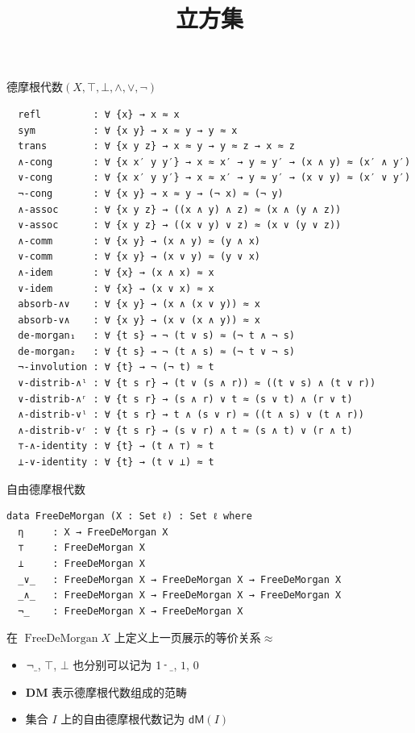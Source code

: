 \documentclass[aspectratio=169,xcolor=dvipsnames]{beamer}
\title{立方集}
\date{}
\newcommand\dM{\mathsf{dM}}
\newcommand\DM{\mathbf{DM}}
\newcommand{\shortminus}{\raisebox{0.3ex}{\scalebox{0.8}[1.0]{-}}}
\newcommand{\mathshortminus}{\mathbin{\text{\normalfont\shortminus}}}
\newcommand{\ul}{{\scalebox{0.4}[1.0]{\_}}}
\DeclareMathOperator\FreeDeMorgan{FreeDeMorgan}
\begin{document}
\begin{frame}
    \titlepage
\end{frame}

\begin{frame}{德摩根代数$(X,\top,\bot,\land,\lor,\neg)$}
\begin{verbatim}
  refl         : ∀ {x} → x ≈ x
  sym          : ∀ {x y} → x ≈ y → y ≈ x
  trans        : ∀ {x y z} → x ≈ y → y ≈ z → x ≈ z
  ∧-cong       : ∀ {x x′ y y′} → x ≈ x′ → y ≈ y′ → (x ∧ y) ≈ (x′ ∧ y′)
  ∨-cong       : ∀ {x x′ y y′} → x ≈ x′ → y ≈ y′ → (x ∨ y) ≈ (x′ ∨ y′)
  ¬-cong       : ∀ {x y} → x ≈ y → (¬ x) ≈ (¬ y)
  ∧-assoc      : ∀ {x y z} → ((x ∧ y) ∧ z) ≈ (x ∧ (y ∧ z))
  ∨-assoc      : ∀ {x y z} → ((x ∨ y) ∨ z) ≈ (x ∨ (y ∨ z)) 
  ∧-comm       : ∀ {x y} → (x ∧ y) ≈ (y ∧ x)
  ∨-comm       : ∀ {x y} → (x ∨ y) ≈ (y ∨ x)
  ∧-idem       : ∀ {x} → (x ∧ x) ≈ x
  ∨-idem       : ∀ {x} → (x ∨ x) ≈ x
  absorb-∧∨    : ∀ {x y} → (x ∧ (x ∨ y)) ≈ x
  absorb-∨∧    : ∀ {x y} → (x ∨ (x ∧ y)) ≈ x
  de-morgan₁   : ∀ {t s} → ¬ (t ∨ s) ≈ (¬ t ∧ ¬ s)
  de-morgan₂   : ∀ {t s} → ¬ (t ∧ s) ≈ (¬ t ∨ ¬ s)
  ¬-involution : ∀ {t} → ¬ (¬ t) ≈ t
  ∨-distrib-∧ˡ : ∀ {t s r} → (t ∨ (s ∧ r)) ≈ ((t ∨ s) ∧ (t ∨ r))
  ∨-distrib-∧ʳ : ∀ {t s r} → (s ∧ r) ∨ t ≈ (s ∨ t) ∧ (r ∨ t)
  ∧-distrib-∨ˡ : ∀ {t s r} → t ∧ (s ∨ r) ≈ ((t ∧ s) ∨ (t ∧ r))
  ∧-distrib-∨ʳ : ∀ {t s r} → (s ∨ r) ∧ t ≈ (s ∧ t) ∨ (r ∧ t)
  ⊤-∧-identity : ∀ {t} → (t ∧ ⊤) ≈ t
  ⊥-∨-identity : ∀ {t} → (t ∨ ⊥) ≈ t
\end{verbatim}
\end{frame}

\begin{frame}{自由德摩根代数}
  \begin{verbatim}
data FreeDeMorgan (X : Set ℓ) : Set ℓ where
  η     : X → FreeDeMorgan X                               
  ⊤     : FreeDeMorgan X                                   
  ⊥     : FreeDeMorgan X                                   
  _∨_   : FreeDeMorgan X → FreeDeMorgan X → FreeDeMorgan X 
  _∧_   : FreeDeMorgan X → FreeDeMorgan X → FreeDeMorgan X 
  ¬_    : FreeDeMorgan X → FreeDeMorgan X                  
  \end{verbatim}
在 $\FreeDeMorgan X$ 上定义上一页展示的等价关系$\approx$
\pause
\begin{itemize}
\item $\neg\ul$, $\top$, $\bot$ 也分别可以记为 $1\mathshortminus\ul$, $1$, $0$
\item $\DM$ 表示德摩根代数组成的范畴
\item 集合 $I$ 上的自由德摩根代数记为 $\dM(I)$
\end{itemize}
\end{frame}
\end{document}
